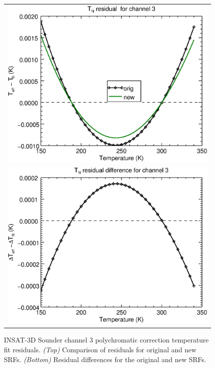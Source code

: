 \begin{figure}[H]
  \centering
  \begin{tabular}{c}
    \includegraphics[scale=0.55]{graphics/sndr/tfit/sndr_insat3d-3.tfit.eps} \\
    \includegraphics[scale=0.55]{graphics/sndr/tfit/sndr_insat3d-3.tfit.difference.eps}
  \end{tabular}
  \caption{INSAT-3D Sounder channel 3 polychromatic correction temperature fit residuals. \emph{(Top)} Comparison of residuals for original and new SRFs. \emph{(Bottom)} Residual differences for the original and new SRFs.}
  \label{fig:sndr_ch3_tfit}
\end{figure}



